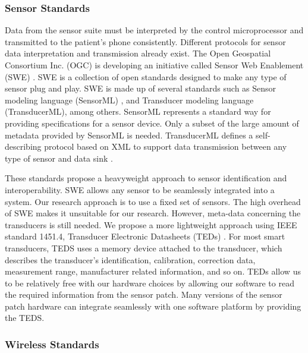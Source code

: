 \subsubsection{Sensor Standards}
\label{subsec:SensorStandars}
Data from the sensor suite must be interpreted by the control microprocessor and transmitted to the patient's phone consistently. Different protocols for sensor data interpretation and transmission already exist.  The Open Geospatial Consortium Inc. (OGC) is developing an initiative called Sensor Web Enablement (SWE) \cite{Botts2007a}. SWE is a collection of open standards designed to make any type of sensor plug and play. SWE is made up of several standards such as Sensor modeling language (SensorML) \cite{Botts2007}, and Transducer modeling language (TransducerML), among others. SensorML represents a standard way for providing specifications for a sensor device. Only a subset of the large amount of metadata provided by SensorML is needed. TransducerML defines a self-describing protocol based on XML to support data transmission between any type of sensor and data sink \cite{Fortier2009}.

These standards propose a heavyweight approach to sensor identification and interoperability. SWE allows any sensor to be seamlessly integrated into a system. Our research approach is to use a fixed set of sensors. The high overhead of SWE makes it unsuitable for our research. However, meta-data concerning the transducers is still needed. We propose a more lightweight approach using IEEE standard 1451.4, Transducer Electronic Datasheets (TEDs) . For most smart transducers, TEDS uses a memory device attached to the transducer, which describes the transducer's identification, calibration, correction data, measurement range, manufacturer related information, and so on. TEDs allow us to be relatively free with our hardware choices by allowing our software to read the required information from the sensor patch. Many versions of the sensor patch hardware can integrate seamlessly with one software platform by providing the TEDS.

\subsubsection{Wireless Standards}
\label{subsubsec:WirelessStandards}

